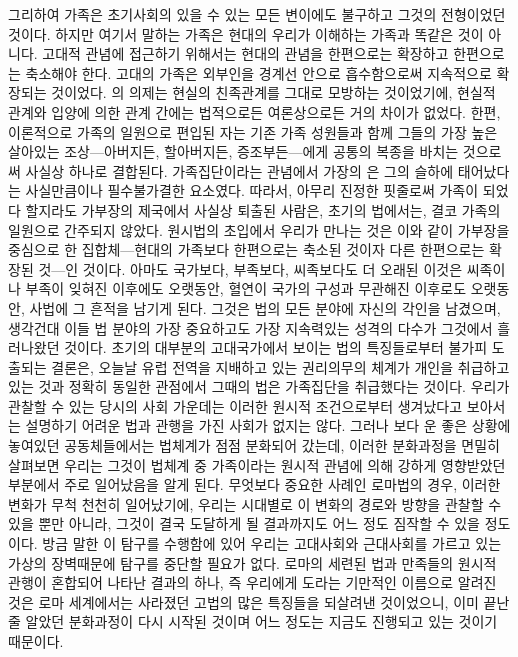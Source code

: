 그리하여 가족은 초기사회의 있을 수 있는 모든 변이에도 불구하고
그것의 전형이었던 것이다.
하지만 여기서 말하는 가족은 현대의 우리가 이해하는 가족과 똑같은 것이 아니다.
고대적 관념에 접근하기 위해서는 현대의 관념을 한편으로는 확장하고
한편으로는 축소해야 한다.
고대의 가족은
외부인을 경계선 안으로 흡수함으로써
지속적으로 확장되는 것이었다.
의 의제는 현실의 친족관계를 그대로 모방하는 것이었기에,
현실적 관계와 입양에 의한 관계 간에는
법적으로든 여론상으로든
거의 차이가 없었다.
한편, 이론적으로 가족의 일원으로 편입된 자는
기존 가족 성원들과 함께 그들의 가장 높은 살아있는 조상---아버지든,
할아버지든, 증조부든---에게
공통의 복종을 바치는 것으로써 사실상 하나로 결합된다.
가족집단이라는 관념에서 가장의 은
그의 슬하에 태어났다는 사실만큼이나
필수불가결한 요소였다.
따라서, 아무리 진정한 핏줄로써 가족이 되었다 할지라도
가부장의 제국에서 사실상 퇴출된 사람은,
초기의 법에서는,
결코 가족의 일원으로 간주되지 않았다.
원시법의 초입에서 우리가 만나는 것은
이와 같이 가부장을 중심으로 한 집합체---현대의 가족보다
한편으로는 축소된 것이자 다른 한편으로는 확장된 것---인 것이다.
아마도 국가보다, 부족보다, 씨족보다도 더 오래된 이것은
씨족이나 부족이 잊혀진 이후에도 오랫동안,
혈연이 국가의 구성과 무관해진 이후로도 오랫동안,
사법에 그 흔적을 남기게 된다.
그것은 법의 모든 분야에 자신의 각인을 남겼으며,
생각건대 이들 법 분야의 가장 중요하고도 가장 지속력있는 성격의 다수가
그것에서 흘러나왔던 것이다.
초기의 대부분의 고대국가에서 보이는 법의 특징들로부터 불가피 도출되는 결론은,
오늘날 유럽 전역을 지배하고 있는 권리의무의 체계가 개인을 취급하고 있는 것과
정확히 동일한 관점에서 그때의 법은 가족집단을 취급했다는 것이다.
우리가 관찰할 수 있는 당시의 사회 가운데는
이러한 원시적 조건으로부터 생겨났다고 보아서는
설명하기 어려운 법과 관행을 가진 사회가 없지는 않다.
그러나 보다 운 좋은 상황에 놓여있던 공동체들에서는
법체계가 점점 분화되어 갔는데,
이러한 분화과정을 면밀히 살펴보면
우리는
그것이 법체계 중 가족이라는 원시적 관념에 의해 강하게 영향받았던 부분에서
주로 일어났음을 알게 된다.
무엇보다 중요한 사례인 로마법의 경우,
이러한 변화가 무척 천천히 일어났기에,
우리는 시대별로 이 변화의 경로와 방향을 관찰할 수 있을 뿐만 아니라,
그것이 결국 도달하게 될 결과까지도 어느 정도 짐작할 수 있을
정도이다.
방금 말한 이 탐구를 수행함에 있어 우리는 고대사회와 근대사회를
가르고 있는 가상의 장벽때문에 탐구를 중단할 필요가 없다.
로마의 세련된 법과 만족들의 원시적 관행이 혼합되어
나타난 결과의 하나, 즉 우리에게 도라는 기만적인 이름으로 알려진 것은
로마 세계에서는 사라졌던 고법의 많은 특징들을 되살려낸 것이었으니,
이미 끝난 줄 알았던 분화과정이 다시 시작된 것이며 어느 정도는 지금도
진행되고 있는 것이기 때문이다.

